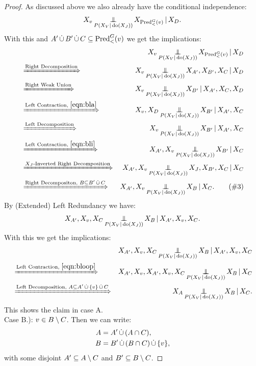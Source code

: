 \begin{Thm}
\begin{proof}
As discussed above we also already have the conditional independence:
\[ X_v \operatorname*{\perp\mkern-11mu\perp}_{P(X_V|\operatorname{do}(X_J))}  X_{\mathrm{Pred}^G_<(v)} \operatorname*{|} X_D. \]
With this and $A' \,\dot{\cup}\, B' \,\dot{\cup}\, C \subseteq \mathrm{Pred}^G_<(v)$ we get the implications:
\begin{align*}
&&X_v \Indep_{P(X_V|\doit(X_J))}  X_{\Pred^G_<(v)} \given X_D\\ 
&\xRightarrow{\text{Right Decomposition}} & 
X_v \Indep_{P(X_V|\doit(X_J))}  X_{A'}, X_{B'}, X_C \given X_D \\
& \xRightarrow{\text{Right Weak Union}}  & 
X_v \Indep_{P(X_V|\doit(X_J))} X_{B'} \given X_{A'}, X_C, X_D \\ 
& \xRightarrow{\text{Left Contraction, }\eqref{eqn:bla}}  & X_v, X_D  \Indep_{P(X_V|\doit(X_J))}  X_{B'} \given X_{A'}, X_C \\
& \xRightarrow{\text{Left Decomposition}}  & X_v \Indep_{P(X_V|\doit(X_J))}  X_{B'} \given X_{A'}, X_C\\
& \xRightarrow{\text{Left Contraction, } \eqref{eqn:bli}}  &  X_{A'},X_v \Indep_{P(X_V|\doit(X_J))}  X_{B'} \given X_C\\
& \xRightarrow{X_J\text{-Inverted Right Decomposition}}  & X_{A'}, X_v \Indep_{P(X_V|\doit(X_J))}  X_J,X_{B'},X_C \given X_C\\
& \xRightarrow{\text{Right Decompositon, } B \ins B' \dcup C}  & X_{A'}, X_v \Indep_{P(X_V|\doit(X_J))}  X_B \given X_C.
 \label{eqn:bloop} \tag{\#3}
\end{align*}
By (Extended) Left Redundancy we have:
\[ X_{A'},X_v, X_C \operatorname*{\perp\mkern-11mu\perp}_{P(X_V|\operatorname{do}(X_J))}  X_B \operatorname*{|} X_{A'},X_v,X_C. \]
With this we get the implications:
\begin{align*}
&&X_{A'},X_v, X_C \Indep_{P(X_V|\doit(X_J))}  X_B \given X_{A'},X_v,X_C\\
& \xRightarrow{\text{Left Contraction, } \eqref{eqn:bloop}}  &  
X_{A'},X_v,X_{A'},X_v, X_C \Indep_{P(X_V|\doit(X_J))}  X_B \given X_C\\
& \xRightarrow{\text{Left Decomposition, } A \ins A' \dcup \{v\} \dcup C}  &    
X_A \Indep_{P(X_V|\doit(X_J))}  X_B \given X_C. 
\end{align*}
This shows the claim in case A.\\

%
Case B.):  $v \in B\setminus C$. Then we can write:
\begin{align*}
    A &= A' \,\dot{\cup}\, (A \cap C), \\
    B &= B' \,\dot{\cup}\, (B \cap C) \,\dot{\cup}\, \{v\},
\end{align*}
with some disjoint $A' \subseteq A \setminus C$ and $B' \subseteq B \setminus C$.


\end{proof}
\end{Thm}

